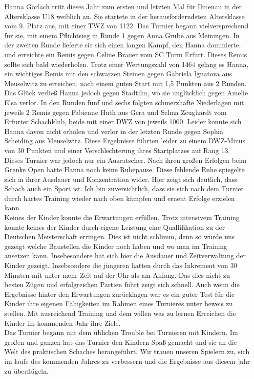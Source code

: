 \documentclass[a4paper,ngerman]{tui-algo-seminar}
\begin{document}
Hanna Görlach tritt dieses Jahr zum ersten und letzten Mal für Ilmenau in der Altersklasse U18 weiblich an. Sie startete in der herausforderndsten Altersklasse vom 9. Platz aus, mit einer TWZ von 1122. Das Turnier begann vielversprechend für sie, mit einem Pflichtsieg in Runde 1 gegen Anna Grube aus Meiningen. In der zweiten Runde lieferte sie sich einen langen Kampf, den Hanna dominierte, und erreichte ein Remis gegen Celine Brauer vom SC Turm Erfurt. Dieses Remis sollte sich bald wiederholen. Trotz einer Wertungszahl von 1464 gelang es Hanna, ein wichtiges Remis mit den schwarzen Steinen gegen Gabriela Ignatova aus Meuselwitz zu erreichen, nach einem guten Start mit 1,5 Punkten aus 2 Runden.
Das Glück verließ Hanna jedoch gegen Stadtilm, wo sie unglücklich gegen Amelie Elsa verlor. In den Runden fünf und sechs folgten schmerzhafte Niederlagen mit jeweils 2 Remis gegen Fabienne Huth aus Gera und Selma Zeughardt vom Erfurter Schachklub, beide mit einer DWZ von jeweils 1000. Leider konnte sich Hanna davon nicht erholen und verlor in der letzten Runde gegen Sophia Scheiding aus Meuselwitz. Diese Ergebnisse führten leider zu einem DWZ-Minus von 30 Punkten und einer Verschlechterung ihres Startplatzes auf Rang 13.
Dieses Turnier war jedoch nur ein Ausrutscher. Nach ihren großen Erfolgen beim Grenke Open hatte Hanna noch keine Ruhepause. Diese fehlende Ruhe spiegelte sich in ihrer Ausdauer und Konzentration wider. Hier zeigt sich deutlich, dass Schach auch ein Sport ist.
Ich bin zuversichtlich, dass sie sich nach dem Turnier durch hartes Training wieder nach oben kämpfen und erneut Erfolge erzielen kann.\\

Keines der Kinder konnte die Erwartungen erfüllen. Trotz intensivem Training konnte keines der Kinder durch eigene Leistung eine Quallifikation zu der Deutschen Meisterschaft erringen. Dies ist nicht schlimm, denn so wurde uns gezeigt welche Baustellen die Kinder noch haben und wo man im Training ansetzen kann. Insebesondere hat sich hier die Ausdauer und Zeitverwaltung der Kinder gezeigt. Insebsondere die jüngeren hatten durch das Inkrement von 30 Minuten mit unter mehr Zeit auf der Uhr als am Anfang. Das dies nicht zu besten Zügen und erfolgreichen Partien führt zeigt sich schnell.  Auch wenn die Ergebnisse hinter den Erwartungen zurücklagen war es ein guter Test für die Kinder ihre eigenen Fähigkeiten im Rahmen eines Turnieres unter beweis zu stellen. Mit ausreichend Training und dem willen was zu lernen Erreichen die Kinder im kommenden Jahr ihre Ziele.
\\
Das Turnier begann mit dem üblichen Trouble bei Turnieren mit Kindern. Im großen und ganzen hat das Turnier den Kindern Spaß gemacht und sie an die Welt des praktischen Schaches herangeführt. Wir trauen unseren Spielern zu, sich im laufe des kommenden Jahres zu verbessern und die Ergebnisse aus diesem jahr zu überflügeln.
\end{document}

